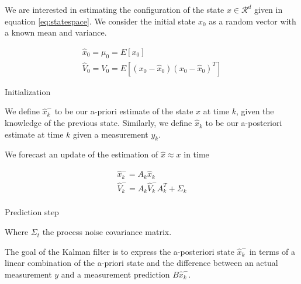 \documentclass[mscthesis]{usiinfthesis}
\begin{document}


We are interested in estimating the configuration of the state $x \in \mathcal{R}^d$ given in equation \ref{eq:statespace}. We consider the initial state $x_0$ as a random vector with a known mean and variance.

\begin{eqfloat}
\begin{equation}
\begin{array}{l}
\hat{x}_0 = \mu_0 = E[x_0] \\
\hat{V}_0 = V_0 = E[(x_0-\hat{x}_0)(x_0-\hat{x}_0)^T] 
\end{array}
\label{eq:linear_kalman_init}
\end{equation}
\caption{Initialization}
\end{eqfloat}


We define $\hat{x}_k^-$ to be our a-priori estimate of the state $x$ at time $k$, given the knowledge of the previous state. Similarly, we define $\hat{x}_k$ to be our a-posteriori estimate at time $k$ given a measurement $y_k$. 

We forecast an update of the estimation of $\hat{x} \approx x$ in time

\begin{eqfloat}[H]
\begin{equation}
\begin{array}{l}
\hat{x}_k^- = A_k \hat{x}_k  \\
\hat{V}_k^- = A_k \hat{V}_k^- A_k^T + \Sigma_k \\
\end{array}
\label{eq:kalman_predict}
\end{equation}
\caption{Prediction step}
\label{eq:linear_kalmann_prediction}
\end{eqfloat}

Where $\Sigma_{t}$ the process noise covariance matrix. 


The goal of the Kalman filter is to express the a-posteriori state $\hat{x}_k^-$ in terms of a linear combination of the a-priori state and the difference between an actual measurement $y$ and a measurement prediction $B \hat{x}_k^-$. 


\end{document}
